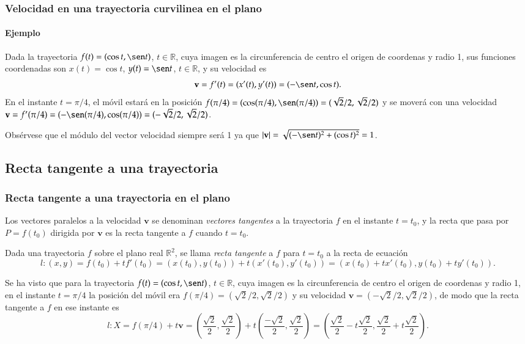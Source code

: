\begin{frame}
\frametitle{Velocidad en una trayectoria curvilinea en el plano}
\framesubtitle{Ejemplo}
Dada la trayectoria $f(t) = (\cos t,\sen t)$, $t\in \mathbb{R}$, cuya imagen es la circunferencia de centro el origen
de coordenas y radio 1, sus funciones coordenadas son $x(t) = \cos t$, $y(t) = \sen t$, $t\in \mathbb{R}$, y su velocidad es 
\[
\mathbf{v}=f'(t)=(x'(t),y'(t))=(-\sen t, \cos t).
\]
En el instante $t=\pi/4$, el móvil estará en la posición $f(\pi/4) = (\cos(\pi/4),\sen(\pi/4)) =(\sqrt{2}/2,\sqrt{2}/2)$
y se moverá con una velocidad $\mathbf{v}=f'(\pi/4)=(-\sen(\pi/4),\cos(\pi/4))=(-\sqrt{2}/2,\sqrt{2}/2)$.
\begin{center}
\scalebox{0.8}{}
\end{center}  
Obsérvese que el módulo del vector velocidad siempre será 1 ya que 
$|\mathbf{v}|=\sqrt{(-\sen t)^2+(\cos t)^2}=1$.
\end{frame}



\subsection{Recta tangente a una trayectoria}
\begin{frame}
\frametitle{Recta tangente a una trayectoria en el plano}
Los vectores paralelos a la velocidad $\mathbf{v}$ se denominan \emph{vectores tangentes} a la trayectoria
$f$ en el instante $t=t_0$, y la recta que pasa por $P=f(t_0)$ dirigida por $\mathbf{v}$ es la recta tangente a $f$ cuando
$t=t_0$.
\begin{definicion}
Dada una trayectoria $f$ sobre el plano real $\mathbb{R}^2$, se llama \emph{recta tangente} a $f$ para $t=t_0$ a la
recta de ecuación
\[
l: (x,y)= f(t_0)+tf'(t_0) = (x(t_0),y(t_0))+t(x'(t_0),y'(t_0)) = (x(t_0)+tx'(t_0),y(t_0)+ty'(t_0)). 
\]
\end{definicion}
Se ha visto que para la trayectoria $f(t) = (\cos t,\sen t)$, $t\in \mathbb{R}$, cuya imagen es la circunferencia de
centro el origen de coordenas y radio 1, en el instante $t=\pi/4$ la posición del móvil era
$f(\pi/4)=(\sqrt{2}/2,\sqrt{2}/2)$ y su velocidad $\mathbf{v}=(-\sqrt{2}/2,\sqrt{2}/2)$, de modo que la recta tangente a
$f$ en ese instante es
\[
l: X=f(\pi/4)+t\mathbf{v} = 
\left(\frac{\sqrt{2}}{2},\frac{\sqrt{2}}{2}\right)+t\left(\frac{-\sqrt{2}}{2},\frac{\sqrt{2}}{2}\right) = 
\left(\frac{\sqrt{2}}{2}-t\frac{\sqrt{2}}{2},\frac{\sqrt{2}}{2}+t\frac{\sqrt{2}}{2}\right).
\]
\end{frame}


